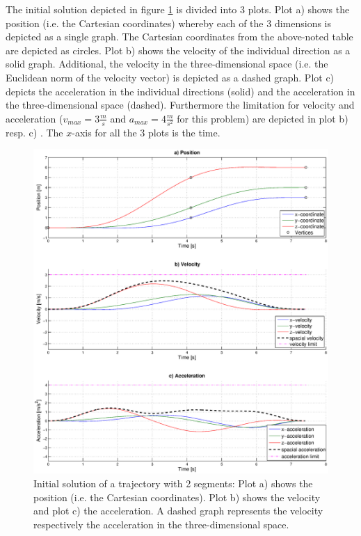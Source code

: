 The initial solution depicted in figure \ref{pic:initialSolution} is divided into 3 plots. Plot a) shows the position (i.e. the Cartesian coordinates) whereby each of the 3 dimensions is depicted as a single graph. The Cartesian coordinates from the above-noted table are depicted as circles. 
Plot b) shows the velocity of the individual direction as a solid graph. Additional, the velocity in the three-dimensional space (i.e. the Euclidean norm of the velocity vector) is depicted as a dashed graph.
Plot c) depicts the acceleration in the individual directions (solid) and the acceleration in the three-dimensional space (dashed). Furthermore the limitation for velocity and acceleration ($v_{max} = 3 \frac{m}{s}$ and $a_{max} = 4 \frac{m}{s^2}$ for this problem) are depicted in plot b) resp. c) . The $x$-axis for all the 3 plots is the time. \newpage


\begin{figure}[h]
   \centering
   \includegraphics[trim = 33mm 20mm 30mm 33mm,width=1\textwidth]{pics/2SegInit7s43.eps}
   \caption{Initial solution of a trajectory with 2 segments: Plot a) shows the position (i.e. the Cartesian coordinates). Plot b) shows the velocity and plot c) the acceleration. A dashed graph represents the velocity respectively the acceleration in the three-dimensional space.}
   \label{pic:initialSolution}
\end{figure}

